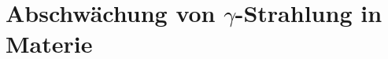 \documentclass[../protokoll.tex]{subfiles}
\begin{document}
\section{Abschwächung von $\gamma$-Strahlung in Materie}\label{sec:Abschwächung Gamma-Strahlung}
\end{document}
